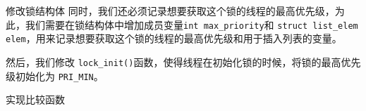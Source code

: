 \documentclass{beamer}
\begin{document}
\begin{frame}





  \framebreak

  \begin{block}{修改锁结构体}
    同时，我们还必须记录想要获取这个锁的线程的最高优先级，为此，我们需要在锁结构体中增加成员变量\texttt{int max\_priority}和 \texttt{struct list\_elem elem}，用来记录想要获取这个锁的线程的最高优先级和用于插入列表的变量。
  \end{block}


  然后，我们修改 \texttt{lock\_init()}函数，使得线程在初始化锁的时候，将锁的最高优先级初始化为 \texttt{PRI\_MIN}。




  \framebreak

  \begin{block}{实现比较函数}


\end{block}
\end{frame}
\end{document}
